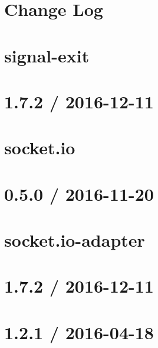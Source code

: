 \documentclass[twoside]{book}
\newcommand{\+}{\discretionary{\mbox{\scriptsize$\hookleftarrow$}}{}{}}
\begin{document}
\chapter{Change Log}
\label{md_app_web_node_modules_signal-exit__c_h_a_n_g_e_l_o_g}

\chapter{signal-\/exit}
\label{md_app_web_node_modules_signal-exit__r_e_a_d_m_e}

\chapter{1.7.2 / 2016-\/12-\/11}
\label{md_app_web_node_modules_socket_8io__history}

\chapter{socket.\+io}
\label{md_app_web_node_modules_socket_8io__readme}

\chapter{0.5.0 / 2016-\/11-\/20}
\label{md_app_web_node_modules_socket_8io-adapter__history}

\chapter{socket.\+io-\/adapter}
\label{md_app_web_node_modules_socket_8io-adapter__readme}

\chapter{1.7.2 / 2016-\/12-\/11}
\label{md_app_web_node_modules_socket_8io-client__history}

\chapter{1.2.1 / 2016-\/04-\/18}
\label{md_app_web_node_modules_socket_8io-client_node_modules_component-emitter__history}

\end{document}

